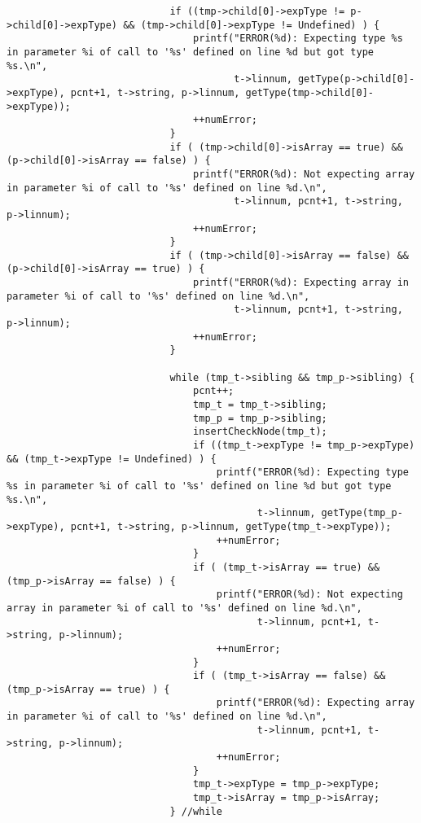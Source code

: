 \documentclass[12pt]{book}
\begin{document}
\begin{lstlisting}
                            if ((tmp->child[0]->expType != p->child[0]->expType) && (tmp->child[0]->expType != Undefined) ) {
                                printf("ERROR(%d): Expecting type %s in parameter %i of call to '%s' defined on line %d but got type %s.\n", 
                                       t->linnum, getType(p->child[0]->expType), pcnt+1, t->string, p->linnum, getType(tmp->child[0]->expType));
                                ++numError;
                            }
                            if ( (tmp->child[0]->isArray == true) && (p->child[0]->isArray == false) ) {
                                printf("ERROR(%d): Not expecting array in parameter %i of call to '%s' defined on line %d.\n", 
                                       t->linnum, pcnt+1, t->string, p->linnum);
                                ++numError;
                            }
                            if ( (tmp->child[0]->isArray == false) && (p->child[0]->isArray == true) ) {
                                printf("ERROR(%d): Expecting array in parameter %i of call to '%s' defined on line %d.\n", 
                                       t->linnum, pcnt+1, t->string, p->linnum);
                                ++numError;
                            }

                            while (tmp_t->sibling && tmp_p->sibling) {
                                pcnt++;
                                tmp_t = tmp_t->sibling;
                                tmp_p = tmp_p->sibling;
                                insertCheckNode(tmp_t);
                                if ((tmp_t->expType != tmp_p->expType) && (tmp_t->expType != Undefined) ) {
                                    printf("ERROR(%d): Expecting type %s in parameter %i of call to '%s' defined on line %d but got type %s.\n", 
                                           t->linnum, getType(tmp_p->expType), pcnt+1, t->string, p->linnum, getType(tmp_t->expType));
                                    ++numError;
                                }
                                if ( (tmp_t->isArray == true) && (tmp_p->isArray == false) ) {
                                    printf("ERROR(%d): Not expecting array in parameter %i of call to '%s' defined on line %d.\n", 
                                           t->linnum, pcnt+1, t->string, p->linnum);
                                    ++numError;
                                }
                                if ( (tmp_t->isArray == false) && (tmp_p->isArray == true) ) {
                                    printf("ERROR(%d): Expecting array in parameter %i of call to '%s' defined on line %d.\n", 
                                           t->linnum, pcnt+1, t->string, p->linnum);
                                    ++numError;
                                }
                                tmp_t->expType = tmp_p->expType;
                                tmp_t->isArray = tmp_p->isArray;
                            } //while


\end{lstlisting}
\end{document}
